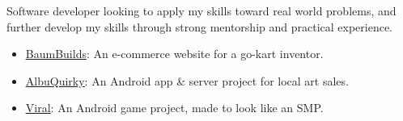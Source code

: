 \smallskip

\raggedright
{}
  Software developer looking to apply my skills toward real world problems, and further develop my skills through strong mentorship and practical experience.

  \medskip


\raggedright
{}
  \centering

  \divider
  

  \medskip


\raggedright
{}
  \centering

  \medskip


\raggedright
{}
  \begin{itemize}
    \item \href{https://baumbuilds.com}{\underline{BaumBuilds}}: An e-commerce website for a go-kart inventor.
    \item \href{https://albuquirky.github.io/}{\underline{AlbuQuirky}}: An Android app \& server project for local art sales.
    \item \href{https://augmentab.github.io/viral/}{\underline{Viral}}: An Android game project, made to look like an SMP.
  \end{itemize}

  \medskip


\raggedright
{}
  \centering
